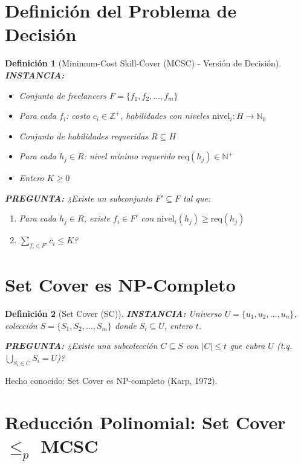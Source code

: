 \documentclass[11pt]{article}
\newtheorem{definition}{Definición}
\begin{document}
	
	\section{Definición del Problema de Decisión}
	
	\begin{definition}[Minimum-Cost Skill-Cover (MCSC) - Versión de Decisión]
		\textbf{INSTANCIA:}
		\begin{itemize}
			\item Conjunto de freelancers $F = \{f_1, f_2, \ldots, f_m\}$
			\item Para cada $f_i$: costo $c_i \in \mathbb{Z}^+$, habilidades con niveles $\text{nivel}_i: H \rightarrow \mathbb{N}_0$
			\item Conjunto de habilidades requeridas $R \subseteq H$
			\item Para cada $h_j \in R$: nivel mínimo requerido $\text{req}(h_j) \in \mathbb{N}^+$
			\item Entero $K \geq 0$
		\end{itemize}
		\textbf{PREGUNTA:} ¿Existe un subconjunto $F' \subseteq F$ tal que:
		\begin{enumerate}
			\item Para cada $h_j \in R$, existe $f_i \in F'$ con $\text{nivel}_i(h_j) \geq \text{req}(h_j)$
			\item $\sum_{f_i \in F'} c_i \leq K$?
		\end{enumerate}
	\end{definition}

	\section{Set Cover es NP-Completo}
	
	\begin{definition}[Set Cover (SC)]
		\textbf{INSTANCIA:} Universo $U = \{u_1, u_2, \ldots, u_n\}$, colección $S = \{S_1, S_2, \ldots, S_m\}$ donde $S_i \subseteq U$, entero $t$.
		
		\noindent\textbf{PREGUNTA:} ¿Existe una subcolección $C \subseteq S$ con $|C| \leq t$ que cubra $U$ (t.q. $\bigcup_{S_i \in C} S_i = U$)?
	\end{definition}
	
	\noindent Hecho conocido: Set Cover es NP-completo (Karp, 1972).

	\section{Reducción Polinomial: Set Cover $\leq_p$ MCSC}
	
\end{document}
